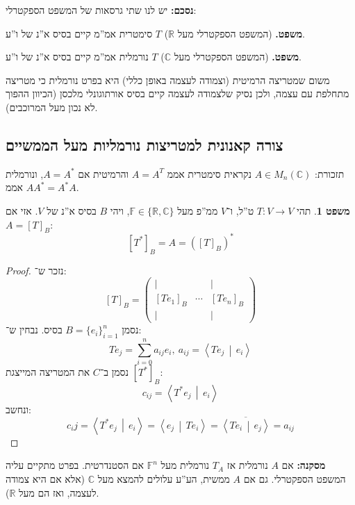 \documentclass[a4paper]{article}
\newcommand\R     {\mathbb{R}}
\newcommand\C     {\mathbb{C}}
\newcommand\ra    {\rangle}
\newcommand\la    {\langle}
\newcommand\ol    {\overline}
\newcommand\sumni     {\sum_{i = 0}^{n}}
\newcommand\F         {\mathbb{F}}
\newcommand\co        {\colon}
\newcommand\pms[1]    {\begin{pmatrix}
		#1
\end{pmatrix}}
\newcommand\mut [2]   {\left \la #1 \,\middle\vert\, #2 \right \ra}
\theoremstyle{definition}
\newtheorem{Theorem}{משפט}
\newcommand\theo  [1] {\begin{Theorem}#1\end{Theorem}}
\begin{document}
	\textbf{נסכם: }יש לנו שתי גרסאות של המשפט הספקטרלי: 
	
	\textbf{משפט. }{(המשפט הספקטרלי מעל $\R$) $T$ סימטרית אמ''מ קיים בסיס א''נ של ו''ע. }
	
	\textbf{משפט. }{(המשפט הספקטרלי מעל $\C$) $T$ נורמלית אמ''מ קיים בסיס א''נ של ו''ע. }
	
	משום שמטריצה הרמיטית (וצמודה לעצמה באופן כללי) היא בפרט נורמלית כי מטריצה מתחלפת עם עצמה, ולכן נסיק שלצמודה לעצמה קיים בסיס אורתוגונלי מלכסן (הכיוון ההפוך לא נכון מעל המרוכבים). 
	
	\subsection{צורה קאנונית למטריצות נורמליות מעל הממשיים}
	תזכורת: $A \in M_n(\C)$ נקראית סימטרית אממ $A = A^T$ והרמיטית אם $A = A^*$, ונורמלית אממ $AA^* = A^*A$. 
	
	\theo{תהי $T \co V \to V$ ט''ל, ו־$V$ ממ''פ מעל $\F \in \{\R, \C\}$, ויהי $B$ בסיס א''נ של $V$. אזי אם $A = [T]_B$: 
		\[ [T^*]_B = A = ([T]_B)^* \]}  
	\begin{proof}
		נזכר ש־: 
		\[ [T]_B = \pms{\vert &  & \vert \\ [Te_1]_B & \cdots & [Te_n]_B \\ \vert &  & \vert} \]
		נסמן $B = \{e_i\}_{i = 1}^{n}$ בסיס. נבחין ש־: 
		\[ Te_j = \sumni a_{ij}e_i, \ a_{ij} = \mut{Te_j}{e_i} \]
		נסמן ב־$C$ את המטריצה המייצגת $[T^*]_B$: 
		\[ c_{ij} = \mut{T^*e_j}{e_i} \]
		ונחשב: 
		\[ c_ij = \mut{T^*e_j}{e_i} = \mut{e_j}{Te_i} = \ol{\mut{Te_i}{e_j}} = a_{ij} \]
		
	\end{proof}
	
	\textbf{מסקנה: }אם $A$ נורמלית אז $T_A$ נורמלית מעל $\F^n$ אם הסטנדרטית. בפרט מתקיים עליה המשפט הספקטרלי. גם אם $A$ ממשית, הע''ע עלולים להמצא מעל $\C$ (אלא אם היא צמודה לעצמה, ואז הם מעל $\R$). 
	
\end{document}
